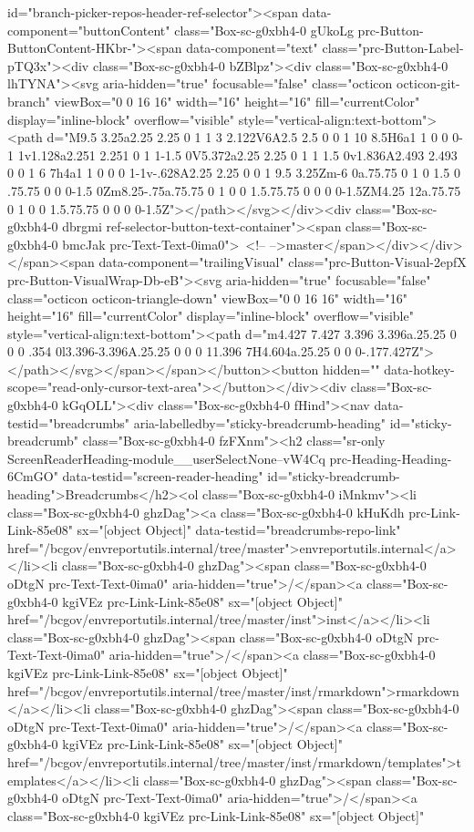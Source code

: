 {{{{{{{{{{{{{{{{{{{{{{{{{{{{{{{id="branch-picker-repos-header-ref-selector"><span data-component="buttonContent" class="Box-sc-g0xbh4-0 gUkoLg prc-Button-ButtonContent-HKbr-"><span data-component="text" class="prc-Button-Label-pTQ3x"><div class="Box-sc-g0xbh4-0 bZBlpz"><div class="Box-sc-g0xbh4-0 lhTYNA"><svg aria-hidden="true" focusable="false" class="octicon octicon-git-branch" viewBox="0 0 16 16" width="16" height="16" fill="currentColor" display="inline-block" overflow="visible" style="vertical-align:text-bottom"><path d="M9.5 3.25a2.25 2.25 0 1 1 3 2.122V6A2.5 2.5 0 0 1 10 8.5H6a1 1 0 0 0-1 1v1.128a2.251 2.251 0 1 1-1.5 0V5.372a2.25 2.25 0 1 1 1.5 0v1.836A2.493 2.493 0 0 1 6 7h4a1 1 0 0 0 1-1v-.628A2.25 2.25 0 0 1 9.5 3.25Zm-6 0a.75.75 0 1 0 1.5 0 .75.75 0 0 0-1.5 0Zm8.25-.75a.75.75 0 1 0 0 1.5.75.75 0 0 0 0-1.5ZM4.25 12a.75.75 0 1 0 0 1.5.75.75 0 0 0 0-1.5Z"></path></svg></div><div class="Box-sc-g0xbh4-0 dbrgmi ref-selector-button-text-container"><span class="Box-sc-g0xbh4-0 bmcJak prc-Text-Text-0ima0"> <!-- -->master</span></div></div></span><span data-component="trailingVisual" class="prc-Button-Visual-2epfX prc-Button-VisualWrap-Db-eB"><svg aria-hidden="true" focusable="false" class="octicon octicon-triangle-down" viewBox="0 0 16 16" width="16" height="16" fill="currentColor" display="inline-block" overflow="visible" style="vertical-align:text-bottom"><path d="m4.427 7.427 3.396 3.396a.25.25 0 0 0 .354 0l3.396-3.396A.25.25 0 0 0 11.396 7H4.604a.25.25 0 0 0-.177.427Z"></path></svg></span></span></button><button hidden="" data-hotkey-scope="read-only-cursor-text-area"></button></div><div class="Box-sc-g0xbh4-0 kGqOLL"><div class="Box-sc-g0xbh4-0 fHind"><nav data-testid="breadcrumbs" aria-labelledby="sticky-breadcrumb-heading" id="sticky-breadcrumb" class="Box-sc-g0xbh4-0 fzFXnm"><h2 class="sr-only ScreenReaderHeading-module__userSelectNone--vW4Cq prc-Heading-Heading-6CmGO" data-testid="screen-reader-heading" id="sticky-breadcrumb-heading">Breadcrumbs</h2><ol class="Box-sc-g0xbh4-0 iMnkmv"><li class="Box-sc-g0xbh4-0 ghzDag"><a class="Box-sc-g0xbh4-0 kHuKdh prc-Link-Link-85e08" sx="[object Object]" data-testid="breadcrumbs-repo-link" href="/bcgov/envreportutils.internal/tree/master">envreportutils.internal</a></li><li class="Box-sc-g0xbh4-0 ghzDag"><span class="Box-sc-g0xbh4-0 oDtgN prc-Text-Text-0ima0" aria-hidden="true">/</span><a class="Box-sc-g0xbh4-0 kgiVEz prc-Link-Link-85e08" sx="[object Object]" href="/bcgov/envreportutils.internal/tree/master/inst">inst</a></li><li class="Box-sc-g0xbh4-0 ghzDag"><span class="Box-sc-g0xbh4-0 oDtgN prc-Text-Text-0ima0" aria-hidden="true">/</span><a class="Box-sc-g0xbh4-0 kgiVEz prc-Link-Link-85e08" sx="[object Object]" href="/bcgov/envreportutils.internal/tree/master/inst/rmarkdown">rmarkdown</a></li><li class="Box-sc-g0xbh4-0 ghzDag"><span class="Box-sc-g0xbh4-0 oDtgN prc-Text-Text-0ima0" aria-hidden="true">/</span><a class="Box-sc-g0xbh4-0 kgiVEz prc-Link-Link-85e08" sx="[object Object]" href="/bcgov/envreportutils.internal/tree/master/inst/rmarkdown/templates">templates</a></li><li class="Box-sc-g0xbh4-0 ghzDag"><span class="Box-sc-g0xbh4-0 oDtgN prc-Text-Text-0ima0" aria-hidden="true">/</span><a class="Box-sc-g0xbh4-0 kgiVEz prc-Link-Link-85e08" sx="[object Object]" }}}}}}}}}}}}}}}}}}}}}}}}}}}}}}}
